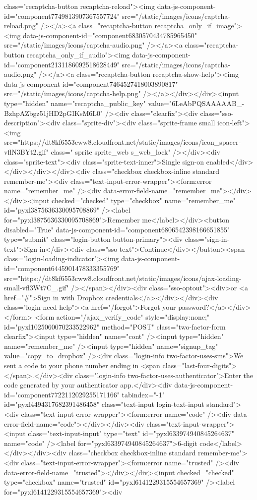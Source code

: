 {class="recaptcha-button recaptcha-reload"><img data-js-component-id="component7749813907367557724" src="/static/images/icons/captcha-reload.png" /></a><a class="recaptcha-button recaptcha_only_if_image"><img data-js-component-id="component6830570434785965450" src="/static/images/icons/captcha-audio.png" /></a><a class="recaptcha-button recaptcha_only_if_audio"><img data-js-component-id="component2131186092518628449" src="/static/images/icons/captcha-audio.png" /></a><a class="recaptcha-button recaptcha-show-help"><img data-js-component-id="component7464527418003890817" src="/static/images/icons/captcha-help.png" /></a></div></div><input type="hidden" name="recaptcha_public_key" value="6LeAbPQSAAAAAB_-BzhpAZbgz51jHD2pGIKsM6L0" /><div class="clearfix"><div class="sso-description"><div class="sprite-div"><div class="sprite-frame small icon-left"><img src="https://dt8kf6553cww8.cloudfront.net/static/images/icons/icon_spacer-vflN3BYt2.gif" class=" sprite sprite_web s_web_lock" /></div><div class="sprite-text"><div class="sprite-text-inner">Single sign-on enabled</div></div></div></div><div class="checkbox checkbox-inline standard remember-me"><div class="text-input-error-wrapper"><form:error name="remember_me" /><div data-error-field-name="remember_me"></div></div><input checked="checked" type="checkbox" name="remember_me" id="pyxl3875636330095708869" /><label for="pyxl3875636330095708869">Remember me</label></div><button disabled="True" data-js-component-id="component6806542398166651855" type="submit" class="login-button button-primary"><div class="sign-in-text">Sign in</div><div class="sso-text">Continue</div></button><span class="login-loading-indicator"><img data-js-component-id="component6445901478333355769" src="https://dt8kf6553cww8.cloudfront.net/static/images/icons/ajax-loading-small-vfl3Wt7C_.gif" /></span></div><div class="sso-optout"><div>or <a href="#">Sign in with Dropbox credentials</a></div></div><div class="login-need-help"><a href="/forgot">Forgot your password?</a></div></form> <form action="/ajax_verify_code" style="display:none;" id="pyxl1025060070233522962" method="POST" class="two-factor-form clearfix"><input type="hidden" name="cont" /><input type="hidden" name="remember_me" /><input type="hidden" name="signup_tag" value="copy_to_dropbox" /><div class="login-info two-factor-uses-sms">We sent a code to your phone number ending in <span class="last-four-digits"></span>.</div><div class="login-info two-factor-uses-authenticator">Enter the code generated by your authenticator app.</div><div data-js-component-id="component7722112029255171166" tabindex="-1" id="pyxl4494317682391486458" class="text-input login-text-input standard"><div class="text-input-error-wrapper"><form:error name="code" /><div data-error-field-name="code"></div></div><div class="text-input-wrapper"><input class="text-input-input" type="text" id="pyxl633974940845264637" name="code" /><label for="pyxl633974940845264637">6-digit code</label></div></div><div class="checkbox checkbox-inline standard remember-me"><div class="text-input-error-wrapper"><form:error name="trusted" /><div data-error-field-name="trusted"></div></div><input checked="checked" type="checkbox" name="trusted" id="pyxl6141229315554657369" /><label for="pyxl6141229315554657369"><div }
